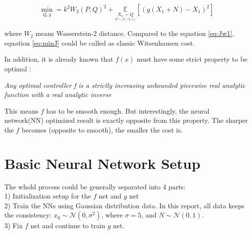 \documentclass[conference,compsoc]{IEEEtran}
\begin{document}
\begin{equation}\label{eq:Jw2}
\min_{Q,g}=k^{2}W_2(P,Q)^{2}+\underset{ \underset{N \sim \mathcal{N}(0,1)}{X_1\sim Q} }{\mathbb{E}}[(g(X_1+N)-X_1)^2]
\end{equation}

where $W_2$ means Wasserstein-2 distance. Compared to the equation \eqref{eq:Jw1}, equation \eqref{eq:minJ} could be called as classic Witsenhausen cost.

In addition, it is already known that $f(x)$ must have some strict property to be optimal \cite{wu2011witsenhausen} :
\begin{adjustwidth}{0.5cm}{}
\textbullet \quad \textit{Any optimal controller f is a strictly increasing unbounded piecewise real analytic function with a real analytic inverse}
\end{adjustwidth}

This means $f$ has to be smooth enough. But interestingly, the neural network(NN) optimized result is exactly opposite from this property. The sharper the $f$ becomes (opposite to smooth), the smaller the cost is.

\section{Basic Neural Network Setup}
The whold process could be generally separated into 4 parts:\\
1) Initialization setup for the $f$ net and $g$ net\\
2) Train the NNs using Gaussian distribution data. In this report, all data keeps the consistency: $x_0\sim \mathcal{N} (0,\sigma^2)$, where $\sigma=5$, and $N\sim \mathcal{N} (0,1)$. \\
3) Fix $f$ net and continue to train $g$ net.
\end{document}
